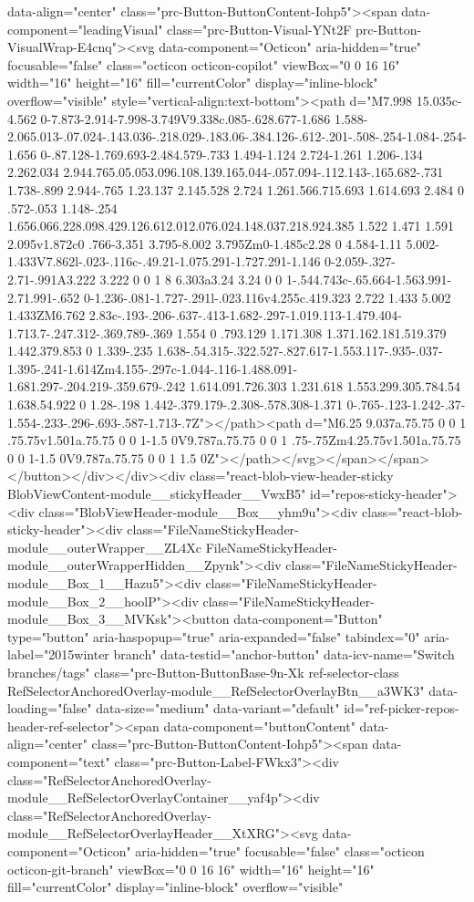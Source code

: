 {{{{{data-align="center" class="prc-Button-ButtonContent-Iohp5"><span data-component="leadingVisual" class="prc-Button-Visual-YNt2F prc-Button-VisualWrap-E4cnq"><svg data-component="Octicon" aria-hidden="true" focusable="false" class="octicon octicon-copilot" viewBox="0 0 16 16" width="16" height="16" fill="currentColor" display="inline-block" overflow="visible" style="vertical-align:text-bottom"><path d="M7.998 15.035c-4.562 0-7.873-2.914-7.998-3.749V9.338c.085-.628.677-1.686 1.588-2.065.013-.07.024-.143.036-.218.029-.183.06-.384.126-.612-.201-.508-.254-1.084-.254-1.656 0-.87.128-1.769.693-2.484.579-.733 1.494-1.124 2.724-1.261 1.206-.134 2.262.034 2.944.765.05.053.096.108.139.165.044-.057.094-.112.143-.165.682-.731 1.738-.899 2.944-.765 1.23.137 2.145.528 2.724 1.261.566.715.693 1.614.693 2.484 0 .572-.053 1.148-.254 1.656.066.228.098.429.126.612.012.076.024.148.037.218.924.385 1.522 1.471 1.591 2.095v1.872c0 .766-3.351 3.795-8.002 3.795Zm0-1.485c2.28 0 4.584-1.11 5.002-1.433V7.862l-.023-.116c-.49.21-1.075.291-1.727.291-1.146 0-2.059-.327-2.71-.991A3.222 3.222 0 0 1 8 6.303a3.24 3.24 0 0 1-.544.743c-.65.664-1.563.991-2.71.991-.652 0-1.236-.081-1.727-.291l-.023.116v4.255c.419.323 2.722 1.433 5.002 1.433ZM6.762 2.83c-.193-.206-.637-.413-1.682-.297-1.019.113-1.479.404-1.713.7-.247.312-.369.789-.369 1.554 0 .793.129 1.171.308 1.371.162.181.519.379 1.442.379.853 0 1.339-.235 1.638-.54.315-.322.527-.827.617-1.553.117-.935-.037-1.395-.241-1.614Zm4.155-.297c-1.044-.116-1.488.091-1.681.297-.204.219-.359.679-.242 1.614.091.726.303 1.231.618 1.553.299.305.784.54 1.638.54.922 0 1.28-.198 1.442-.379.179-.2.308-.578.308-1.371 0-.765-.123-1.242-.37-1.554-.233-.296-.693-.587-1.713-.7Z"></path><path d="M6.25 9.037a.75.75 0 0 1 .75.75v1.501a.75.75 0 0 1-1.5 0V9.787a.75.75 0 0 1 .75-.75Zm4.25.75v1.501a.75.75 0 0 1-1.5 0V9.787a.75.75 0 0 1 1.5 0Z"></path></svg></span></span></button></div></div><div class="react-blob-view-header-sticky BlobViewContent-module__stickyHeader__VwxB5" id="repos-sticky-header"><div class="BlobViewHeader-module__Box__yhm9u"><div class="react-blob-sticky-header"><div class="FileNameStickyHeader-module__outerWrapper__ZL4Xc FileNameStickyHeader-module__outerWrapperHidden__Zpynk"><div class="FileNameStickyHeader-module__Box_1__Hazu5"><div class="FileNameStickyHeader-module__Box_2__hoolP"><div class="FileNameStickyHeader-module__Box_3__MVKsk"><button data-component="Button" type="button" aria-haspopup="true" aria-expanded="false" tabindex="0" aria-label="2015winter branch" data-testid="anchor-button" data-icv-name="Switch branches/tags" class="prc-Button-ButtonBase-9n-Xk ref-selector-class RefSelectorAnchoredOverlay-module__RefSelectorOverlayBtn__a3WK3" data-loading="false" data-size="medium" data-variant="default" id="ref-picker-repos-header-ref-selector"><span data-component="buttonContent" data-align="center" class="prc-Button-ButtonContent-Iohp5"><span data-component="text" class="prc-Button-Label-FWkx3"><div class="RefSelectorAnchoredOverlay-module__RefSelectorOverlayContainer__yaf4p"><div class="RefSelectorAnchoredOverlay-module__RefSelectorOverlayHeader__XtXRG"><svg data-component="Octicon" aria-hidden="true" focusable="false" class="octicon octicon-git-branch" viewBox="0 0 16 16" width="16" height="16" fill="currentColor" display="inline-block" overflow="visible" }}}}}
